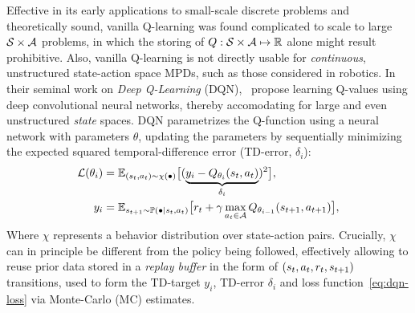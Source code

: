 Effective in its early applications to small-scale discrete problems and theoretically sound, vanilla Q-learning was found complicated to scale to large \( \mathcal S \times \mathcal A \) problems, in which the storing of \( Q : \mathcal S \times \mathcal A \mapsto \mathbb R \) alone might result prohibitive. 
Also, vanilla Q-learning is not directly usable for \emph{continuous}, unstructured state-action space MPDs, such as those considered in robotics.
In their seminal work on \emph{Deep Q-Learning} (DQN),~\citet{mnihPlayingAtariDeep2013} propose learning Q-values using deep convolutional neural networks, thereby accomodating for large and even unstructured \emph{state} spaces.
DQN parametrizes the Q-function using a neural network with parameters \( \theta \), updating the parameters by sequentially minimizing the expected squared temporal-difference error (TD-error, \( \delta_i \)):
\begin{align}
\mathcal L(\theta_i) &= \mathbb E_{(s_t, a_t) \sim \chi(\bullet)} 
    \big[ 
        (\underbrace{y_i - Q_{\theta_i}(s_t, a_t)}_{\delta_i})^2 
    \big], \label{eq:dqn-loss} \\
    y_i &= \mathbb E_{s_{t+1} \sim \mathbb P(\bullet \vert s_t, a_t)} \big[ r_t + \gamma \max_{a_t \in \mathcal A} Q_{\theta_{i-1}} (s_{t+1}, a_{t+1}) \big], \label{eq:TD-target}
\end{align}
Where \( \chi \) represents a behavior distribution over state-action pairs. 
Crucially, \( \chi \) can in principle be different from the policy being followed, effectively allowing to reuse prior data stored in a \emph{replay buffer} in the form of \( (s_t, a_t, r_t, s_{t+1}) \) transitions, used to form the TD-target \( y_i \), TD-error \( \delta_i \) and loss function~\ref{eq:dqn-loss} via Monte-Carlo (MC) estimates.


